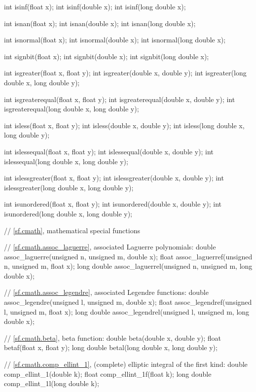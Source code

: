 \begin{codeblock}
{  int isinf(float x);
  int isinf(double x);
  int isinf(long double x);

  int isnan(float x);
  int isnan(double x);
  int isnan(long double x);

  int isnormal(float x);
  int isnormal(double x);
  int isnormal(long double x);

  int signbit(float x);
  int signbit(double x);
  int signbit(long double x);

  int isgreater(float x, float y);
  int isgreater(double x, double y);
  int isgreater(long double x, long double y);

  int isgreaterequal(float x, float y);
  int isgreaterequal(double x, double y);
  int isgreaterequal(long double x, long double y);

  int isless(float x, float y);
  int isless(double x, double y);
  int isless(long double x, long double y);

  int islessequal(float x, float y);
  int islessequal(double x, double y);
  int islessequal(long double x, long double y);

  int islessgreater(float x, float y);
  int islessgreater(double x, double y);
  int islessgreater(long double x, long double y);

  int isunordered(float x, float y);
  int isunordered(double x, double y);
  int isunordered(long double x, long double y);

  // \ref{sf.cmath}, mathematical special functions

  // \ref{sf.cmath.assoc_laguerre}, associated Laguerre polynomials:
  double       assoc_laguerre(unsigned n, unsigned m, double x);
  float        assoc_laguerref(unsigned n, unsigned m, float x);
  long double  assoc_laguerrel(unsigned n, unsigned m, long double x);

  // \ref{sf.cmath.assoc_legendre}, associated Legendre functions:
  double       assoc_legendre(unsigned l, unsigned m, double x);
  float        assoc_legendref(unsigned l, unsigned m, float x);
  long double  assoc_legendrel(unsigned l, unsigned m, long double x);

  // \ref{sf.cmath.beta}, beta function:
  double       beta(double x, double y);
  float        betaf(float x, float y);
  long double  betal(long double x, long double y);

  // \ref{sf.cmath.comp_ellint_1}, (complete) elliptic integral of the first kind:
  double       comp_ellint_1(double k);
  float        comp_ellint_1f(float k);
  long double  comp_ellint_1l(long double k);

}
\end{codeblock}
